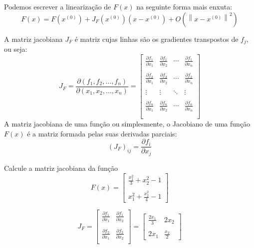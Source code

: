 \documentclass[main.tex]{subfiles}
\begin{document}
Podemos escrever a linearização de $F(x)$ na seguinte forma mais enxuta:
$$F(x)=F\left(x^{(0)}\right)+ J_F(x^{(0)})\left(x-x^{(0)}\right) + O\left(\left\|x-x^{(0)}\right\|^2\right) $$

A matriz jacobiana $J_F$ é matriz cujas linhas são os gradientes transpostos de $f_j$, ou seja:
$$J_F= \frac{\partial(f_1,f_2,\ldots,f_n)}{\partial(x_1,x_2,\ldots,x_n)}=\left[
\begin{array}{ccccc}
\frac{\partial f_1}{\partial x_1}&\frac{\partial f_1}{\partial x_2}&\cdots&\frac{\partial f_1}{\partial x_n}\\~\\
\frac{\partial f_2}{\partial x_1}&\frac{\partial f_2}{\partial x_2}&\cdots&\frac{\partial f_2}{\partial x_n}\\~\\
\vdots&\vdots&\ddots&\vdots\\~\\
\frac{\partial f_n}{\partial x_1}&\frac{\partial f_n}{\partial x_2}&\cdots&\frac{\partial f_n}{\partial x_n}\\~\\
\end{array}
\right]
$$
A matriz jacobiana de uma função ou simplesmente, o Jacobiano de uma função $F(x)$ é a matriz formada pelas suas derivadas parciais:
$$\left(J_F\right)_{ij}=\frac{\partial f_i}{\partial x_j}$$


\begin{ex} Calcule a matriz jacobiana da função
$$F(x)=\left[
\begin{array}{c}
\frac{x_1^2}{3}+x_2^2-1\\~\\
x_1^2+\frac{x_2^2}{4}-1
\end{array}
\right]$$

$$J_F=\left[
\begin{array}{cc}
\frac{\partial f_1}{\partial x_1} & \frac{\partial f_1}{\partial x_2}\\~\\
\frac{\partial f_2}{\partial x_1} & \frac{\partial f_2}{\partial x_2}\\
\end{array}
\right]=\left[
\begin{array}{cc}
\frac{2x_1}{3} & 2x_2\\~\\
2x_1&\frac{x_2}{2}
\end{array}
\right]
$$
\end{ex}
\end{document}
